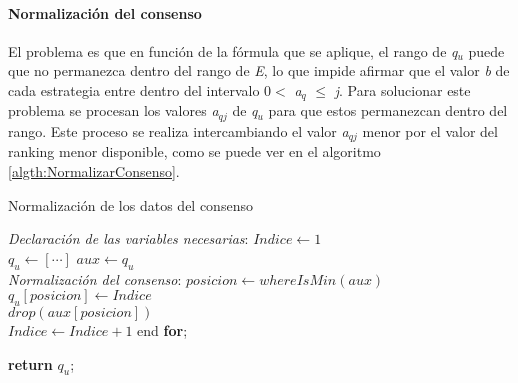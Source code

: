\newpage

\paragraph{Normalización del consenso}
El problema es que en función de la fórmula que se aplique, el rango de \textit{q$_{u}$} puede que no permanezca dentro del rango de \textit{E}, lo que impide afirmar que el valor \textit{b} de cada estrategia entre dentro del intervalo 0$<$
\textit{a$_{q}$ }$\leq$\textit{ j}. Para solucionar este problema se procesan los valores \textit{a$_{qj}$} de \textit{q$_{u}$} para que estos permanezcan dentro del rango. Este proceso se realiza intercambiando el valor \textit{a$_{qj}$} menor por el valor del ranking menor disponible, como se puede ver en el algoritmo \ref{algth:NormalizarConsenso}.

\begin{algorithm}[H]
    \caption{Normalización de los datos del consenso}\label{algth:NormalizarConsenso}
    \begin{algorithmic}[1]
            \BState \emph{Declaración de las variables necesarias}:
            \State $Indice \gets 1$
            \\
            \State $q_{u} \gets [\cdots]$
            \State $aux \gets q_{u}$
            \\                
            \BState \emph{Normalización del consenso}:
                \State $posicion \gets whereIsMin(aux)$ 
                \\
                \State $q_{u}[posicion] \gets Indice$ 
                \\
                \State $\textit{drop}(aux[posicion])$ 
                \\
                \State $Indice \gets Indice + 1$ 
            \EndFor
            \State end \textbf{for};

            \State \textbf{return} $q_{u}$;

        \EndProcedure
    \end{algorithmic}
\end{algorithm}

